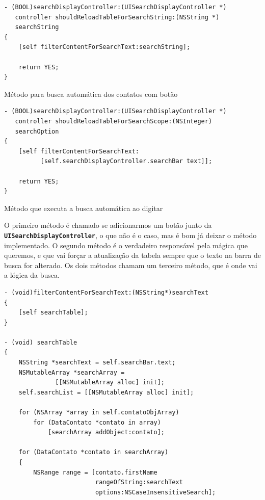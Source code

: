 \documentclass[a4paper,12pt,brazil,doubleside]{book}
\begin{document}
\begin{singlespace}
\begin{listing}[H]
\begin{verbatim}
- (BOOL)searchDisplayController:(UISearchDisplayController *)
   controller shouldReloadTableForSearchString:(NSString *)
   searchString
{
    [self filterContentForSearchText:searchString];

    return YES;
}
\end{verbatim}
\caption{Método para busca automática dos contatos com botão}
\end{listing}

\begin{listing}[H]
\begin{verbatim}
- (BOOL)searchDisplayController:(UISearchDisplayController *)
   controller shouldReloadTableForSearchScope:(NSInteger)
   searchOption
{
    [self filterContentForSearchText:
          [self.searchDisplayController.searchBar text]];
    
    return YES;
}
\end{verbatim}
\caption{Método que executa a busca automática ao digitar}
\end{listing}

O primeiro método é chamado se adicionarmos um botão junto da\\
\texttt{\textbf{UISearchDisplayController}}, o que não é o caso, mas é bom já deixar o método implementado. O segundo método é o verdadeiro responsável pela mágica que queremos, e que vai forçar a atualização da tabela sempre que o texto na barra de busca for alterado. Os dois métodos chamam um terceiro método, que é onde vai a lógica da busca.

\begin{listing}[H]
\begin{verbatim}
- (void)filterContentForSearchText:(NSString*)searchText
{
    [self searchTable];
}

- (void) searchTable
{
    NSString *searchText = self.searchBar.text;
    NSMutableArray *searchArray =
              [[NSMutableArray alloc] init];
    self.searchList = [[NSMutableArray alloc] init];
    
    for (NSArray *array in self.contatoObjArray)
        for (DataContato *contato in array)
            [searchArray addObject:contato];
    
    for (DataContato *contato in searchArray)
    {
        NSRange range = [contato.firstName
                         rangeOfString:searchText
                         options:NSCaseInsensitiveSearch];
        

\end{verbatim}
\end{listing}
\end{singlespace}
\end{document}

